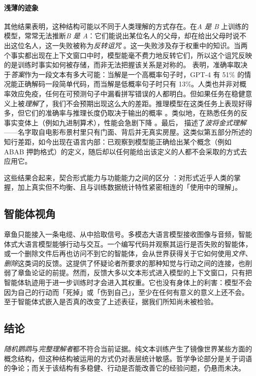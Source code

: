 \paragraph{浅薄的迹象}
其他结果表明，这种结构可能以不同于人类理解的方式存在。在{\em A 是 B} 上训练的模型，常常无法推断{\em B 是 A}：它们能说出某位名人的父母，却在给出父母时说不出这位名人，这一失败被称为\emph{反转诅咒} \citep{berglund2024reversalcurse}。这一失败涉及存于权重中的知识。当两个事实都出现在上下文窗口中时，模型能毫不费力地反转它们，所以这个诅咒反映的是训练时事实如何被存储，而非无法把握该关系是对称的。\citet{mccoy2024embers} 表明，准确率取决于\emph{答案}作为一段文本有多大可能：当解是一个高概率句子时，GPT-4 有 51\% 的情况能正确解码一段简单代码，而当解是低概率句子时只有 13\%。人类也并非对概率效应免疫，任何在可预测句子中漏看拼写错误的人都明白。但如果任务在稳健意义上被\emph{理解}了，我们不会预期出现这么大的差距。推理模型在这类任务上表现好得多，但它们的准确率与推理长度仍取决于输出的概率 \citep{mccoy2024o1}。类似地，在熟悉任务的反事实变体上（例如九进制算术），性能会急剧下降 \citep{wu2024reasoning}。最后，\citet{mancoridis2025potemkin} 描述了\emph{波将金式理解}——名字取自电影布景村里只有门面、背后并无真实房屋。这类似第五部分所述的知行差距，如今出现在语言内部：已观察到模型能正确给出某个概念（例如 ABAB 押韵格式）的定义，随后却以任何能给出该定义的人都不会采取的方式去应用它。

这些结果合起来，契合形式能力与功能能力之间的区分 \citep{mahowald2023dissociating}：对形式近乎人类的掌握，加上真实但不均衡、且与训练数据统计特性紧密相连的「使用中的理解」。

\subsection{智能体视角}
章鱼只能接入一条电缆、从中拾取信号。多模态大语言模型接收图像与音频，智能体式大语言模型能够行动与交互。一个编写代码并观察其运行是否失败的智能体，或一个删除文件后再也访问不到它的智能体，会从世界获得关于它如何使用{\em 文件}、{\em 删除}这类词的反馈。这提供了怀疑论者所要求的那种知觉与行动之间的连接，也削弱了章鱼论证的前提。然而，反馈大多以文本形式进入模型的上下文窗口，只有把智能体轨迹用于进一步训练时才会进入其权重。它也没有身体上的利害：模型不会因为自己的行动而「死掉」或「伤到自己」，至少在任何有意义的意义上还不会。至于智能体式嵌入是否真的改变了上述表征，据我们所知尚未被检验。

\subsection{结论}
\emph{随机鹦鹉}与\emph{完整理解者}都不符合当前证据。纯文本训练产生了镜像世界某些方面的概念结构，但这种结构被运用的方式仍对表层统计敏感。哲学争论部分是关于词语的争论；而关于该结构有多稳健、行动是否能改善它的经验问题，仍悬而未决。
